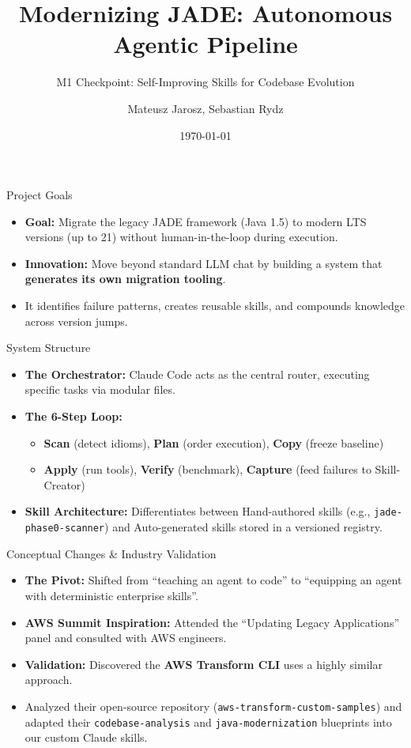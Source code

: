 \documentclass[aspectratio=169]{beamer}
\title{Modernizing JADE: Autonomous Agentic Pipeline}
\subtitle{M1 Checkpoint: Self-Improving Skills for Codebase Evolution}
\author{Mateusz Jarosz, Sebastian Rydz}
\institute{Warsaw University of Technology}
\date{\today}
\begin{document}
\begin{frame}
  \titlepage
\end{frame}

\begin{frame}{Project Goals}
\begin{itemize}
  \item \textbf{Goal:} Migrate the legacy JADE framework (Java 1.5) to modern LTS versions (up to 21) without human-in-the-loop during execution.
  \item \textbf{Innovation:} Move beyond standard LLM chat by building a system that \textbf{generates its own migration tooling}.
  \item It identifies failure patterns, creates reusable skills, and compounds knowledge across version jumps.
\end{itemize}
\end{frame}

\begin{frame}{System Structure}
\begin{itemize}
  \item \textbf{The Orchestrator:} Claude Code acts as the central router, executing specific tasks via modular files.
  \item \textbf{The 6-Step Loop:}
  \begin{itemize}
    \item \textbf{Scan} (detect idioms), \textbf{Plan} (order execution), \textbf{Copy} (freeze baseline)
    \item \textbf{Apply} (run tools), \textbf{Verify} (benchmark), \textbf{Capture} (feed failures to Skill-Creator)
  \end{itemize}
  \item \textbf{Skill Architecture:} Differentiates between Hand-authored skills (e.g., \texttt{jade-phase0-scanner}) and Auto-generated skills stored in a versioned registry.
\end{itemize}
\end{frame}

\begin{frame}{Conceptual Changes \& Industry Validation}
\begin{itemize}
  \item \textbf{The Pivot:} Shifted from ``teaching an agent to code'' to ``equipping an agent with deterministic enterprise skills''.
  \item \textbf{AWS Summit Inspiration:} Attended the ``Updating Legacy Applications'' panel and consulted with AWS engineers.
  \item \textbf{Validation:} Discovered the \textbf{AWS Transform CLI} uses a highly similar approach.
  \item Analyzed their open-source repository (\texttt{aws-transform-custom-samples}) and adapted their \texttt{codebase-analysis} and \texttt{java-modernization} blueprints into our custom Claude skills.
\end{itemize}
\end{frame}
\end{document}
